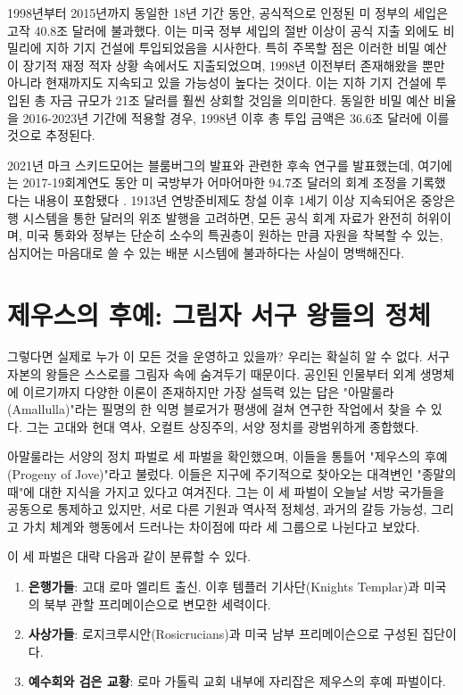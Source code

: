 \documentclass[10pt,twocolumn,letterpaper]{article}
\begin{document}
1998년부터 2015년까지 동일한 18년 기간 동안, 공식적으로 인정된 미 정부의 세입은 고작 40.8조 달러에 불과했다. 이는 미국 정부 세입의 절반 이상이 공식 지출 외에도 비밀리에 지하 기지 건설에 투입되었음을 시사한다\cite{15}. 특히 주목할 점은 이러한 비밀 예산이 장기적 재정 적자 상황 속에서도 지출되었으며, 1998년 이전부터 존재해왔을 뿐만 아니라 현재까지도 지속되고 있을 가능성이 높다는 것이다. 이는 지하 기지 건설에 투입된 총 자금 규모가 21조 달러를 훨씬 상회할 것임을 의미한다. 동일한 비밀 예산 비율을 2016-2023년 기간에 적용할 경우, 1998년 이후 총 투입 금액은 36.6조 달러에 이를 것으로 추정된다.

2021년 마크 스키드모어는 블룸버그의 발표와 관련한 후속 연구를 발표했는데, 여기에는 2017-19회계연도 동안 미 국방부가 어마어마한 94.7조 달러의 회계 조정을 기록했다는 내용이 포함됐다 \cite{17,18}. 1913년 연방준비제도 창설 이후 1세기 이상 지속되어온 중앙은행 시스템을 통한 달러의 위조 발행을 고려하면\cite{37}, 모든 공식 회계 자료가 완전히 허위이며, 미국 통화와 정부는 단순히 소수의 특권층이 원하는 만큼 자원을 착복할 수 있는, 심지어는 마음대로 쓸 수 있는 배분 시스템에 불과하다는 사실이 명백해진다.

\section{제우스의 후예: 그림자 서구 왕들의 정체}
그렇다면 실제로 누가 이 모든 것을 운영하고 있을까? 우리는 확실히 알 수 없다. 서구 자본의 왕들은 스스로를 그림자 속에 숨겨두기 때문이다. 공인된 인물부터 외계 생명체에 이르기까지 다양한 이론이 존재하지만 가장 설득력 있는 답은 "아말룰라(Amallulla)"라는 필명의 한 익명 블로거가 평생에 걸쳐 연구한 작업에서 찾을 수 있다. 그는 고대와 현대 역사, 오컬트 상징주의, 서양 정치를 광범위하게 종합했다\cite{33,34}.

아말룰라는 서양의 정치 파벌로 세 파벌을 확인했으며, 이들을 통틀어 "제우스의 후예(Progeny of Jove)"라고 불렀다. 이들은 지구에 주기적으로 찾아오는 대격변인 "종말의 때"에 대한 지식을 가지고 있다고 여겨진다. 그는 이 세 파벌이 오늘날 서방 국가들을 공동으로 통제하고 있지만, 서로 다른 기원과 역사적 정체성, 과거의 갈등 가능성, 그리고 가치 체계와 행동에서 드러나는 차이점에 따라 세 그룹으로 나뉜다고 보았다.

이 세 파벌은 대략 다음과 같이 분류할 수 있다.

\begin{flushleft}
\begin{enumerate}
    \item \textbf{은행가들}: 고대 로마 엘리트 출신. 이후 템플러 기사단(Knights Templar)과 미국의 북부 관할 프리메이슨으로 변모한 세력이다.
    \item \textbf{사상가들}: 로지크루시안(Rosicrucians)과 미국 남부 프리메이슨으로 구성된 집단이다.
    \item \textbf{예수회와 검은 교황}: 로마 가톨릭 교회 내부에 자리잡은 제우스의 후예 파벌이다.
\end{enumerate}
\end{flushleft}
\end{document}
